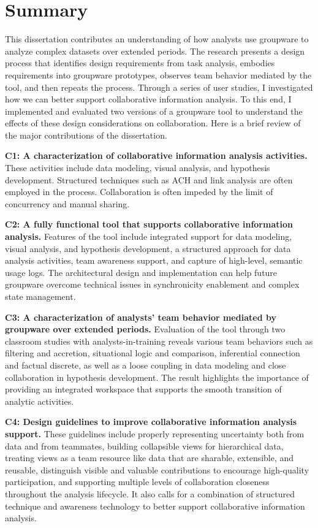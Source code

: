 \section{Summary}

This dissertation contributes an understanding of how analysts use groupware to analyze complex datasets over extended periods. The research presents a design process that identifies design requirements from task analysis, embodies requirements into groupware prototypes, observes team behavior mediated by the tool, and then repeats the process. Through a series of user studies, I investigated how we can better support collaborative information analysis. To this end, I implemented and evaluated two versions of a groupware tool to understand the effects of these design considerations on collaboration. Here is a brief review of the major contributions of the dissertation.

\textbf{C1: A characterization of collaborative information analysis activities.} 
These activities include data modeling, visual analysis, and hypothesis development. Structured techniques such as ACH and link analysis are often employed in the process. Collaboration is often impeded by the limit of concurrency and manual sharing.

\textbf{C2: A fully functional tool that supports collaborative information analysis.}
Features of the tool include integrated support for data modeling, visual analysis, and hypothesis development, a structured approach for data analysis activities, team awareness support, and capture of high-level, semantic usage logs. The architectural design and implementation can help future groupware overcome technical issues in synchronicity enablement and complex state management.

\textbf{C3: A characterization of analysts' team behavior mediated by groupware over extended periods.}
Evaluation of the tool through two classroom studies with analysts-in-training reveals various team behaviors such as filtering and accretion, situational logic and comparison, inferential connection and factual discrete, as well as a loose coupling in data modeling and close collaboration in hypothesis development. The result highlights the importance of providing an integrated workspace that supports the smooth transition of analytic activities.

\textbf{C4: Design guidelines to improve collaborative information analysis support.}
These guidelines include properly representing uncertainty both from data and from teammates, building collapsible views for hierarchical data, treating views as a team resource like data that are sharable, extensible, and reusable, distinguish visible and valuable contributions to encourage high-quality participation, and supporting multiple levels of collaboration closeness throughout the analysis lifecycle. It also calls for a combination of structured technique and awareness technology to better support collaborative information analysis.

